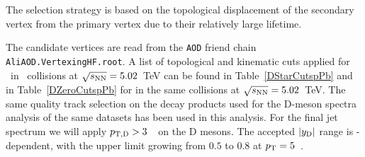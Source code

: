 The selection strategy is based on the topological displacement of the secondary vertex from the primary vertex due to their relatively large lifetime.

The candidate vertices are read from the \texttt{AOD} friend chain \texttt{AliAOD.VertexingHF.root}. A list of topological and kinematic cuts applied for \Dstar\ in \pPb\ collisions at $\sqrt{s_{\rm NN}}=5.02$~TeV can be found in Table~\ref{DStarCutspPb} and in Table~\ref{DZeroCutspPb} for \Dzero in the same \pPb collisions at $\sqrt{s_{\rm NN}}=5.02$~TeV.
The same quality track selection on the decay products used for the D-meson spectra analysis of the same datasets has been used in this analysis.
For the final jet spectrum we will apply $p_{\mathrm{T,D}}> 3$~\GeVc\ on the D mesons. The accepted $|y_{\rm D}|$ range is \pt-dependent, with the upper limit growing from $0.5$ to $0.8$ at $p_{\rm T}=5$~\GeVc.

